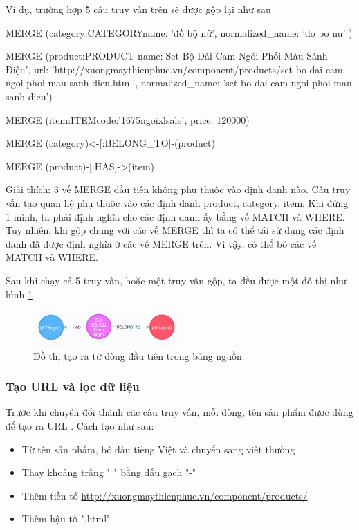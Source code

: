 Ví dụ, trường hợp 5 câu truy vấn trên sẽ được gộp lại như sau

\medskip

MERGE (category:CATEGORY{name: 'đồ bộ nữ', normalized\_name: 'do bo nu' })

MERGE (product:PRODUCT{ name:'Set Bộ Dài Cam Ngói Phối Màu Sành Điệu', url: 'http://xuongmaythienphuc.vn/component/products/set-bo-dai-cam-ngoi-phoi-mau-sanh-dieu.html', normalized\_name: 'set bo dai cam ngoi phoi mau sanh dieu'})

MERGE (item:ITEM{code:'1675ngoixlsale', price: 120000})

MERGE (category)<-[:BELONG\_TO]-(product)

MERGE (product)-[:HAS]->(item)

\medskip

Giải thích: 3 vế MERGE đầu tiên không phụ thuộc vào định danh nào. Câu truy vấn tạo quan hệ phụ thuộc vào các định danh product, category, item. Khi đứng 1 mình, ta phải định nghĩa cho các định danh ấy bằng vế MATCH và WHERE. Tuy nhiên, khi gộp chung với các vế MERGE thì ta có thể tái sử dụng các định danh đã được định nghĩa ở các vế MERGE trên. Vì vậy, có thể bỏ các vế MATCH và WHERE. 

\bigskip

Sau khi chạy cả 5 truy vấn, hoặc một truy vấn gộp, ta đều được một đồ thị như hình \ref{fig:cypher} 

\begin{figure}[h]
\centering
\includegraphics[width=0.5\textwidth]{imagev2/merge5cypher.png}
\caption{\label{fig:cypher} Đồ thị tạo ra từ dòng đầu tiên trong bảng nguồn}
\end{figure}

\subsubsection{Tạo URL và lọc dữ liệu}

Trước khi chuyển đổi thành các câu truy vấn, mỗi dòng, tên sản phẩm được dùng để tạo ra URL . Cách tạo như sau: 

\begin{itemize}
\item Từ tên sản phẩm, bỏ dấu tiếng Việt và chuyển sang viết thường 
\item Thay khoảng trắng " " bằng dấu gạch "-" 
\item Thêm tiền tố  \url{http://xuongmaythienphuc.vn/component/products/}.
\item Thêm hậu tố ".html"
\end{itemize}

